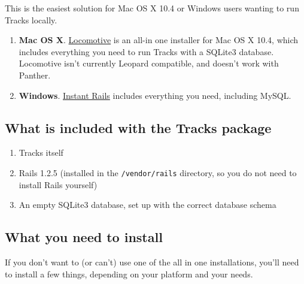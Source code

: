 \documentclass[10pt,twoside]{memoir}
\begin{document}
This is the easiest solution for Mac OS X 10.4 or Windows users wanting to run Tracks locally.


\begin{enumerate}


\item \textbf{Mac OS X}. \href{http://locomotive.sourceforge.net/}{Locomotive} is an all-in one installer for Mac OS X 10.4, which includes everything you need to run Tracks with a SQLite3 database. Locomotive isn't currently Leopard compatible, and doesn't work with Panther.

\item \textbf{Windows}. \href{http://instantrails.rubyforge.org/wiki/wiki.pl}{Instant Rails} includes everything you need, including MySQL.
\end{enumerate}

\subsection{What is included with the Tracks package}
\label{whatisincludedwiththetrackspackage}

\begin{enumerate}


\item Tracks itself

\item Rails 1.2.5 (installed in the \texttt{/vendor/rails} directory, so you do not need to install Rails yourself)

\item An empty SQLite3 database, set up with the correct database schema
\end{enumerate}

\subsection{What you need to install}
\label{whatyouneed}

If you don't want to (or can't) use one of the all in one installations, you'll need to install a few things, depending on your platform and your needs.
\end{document}
